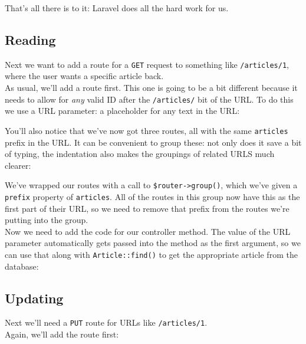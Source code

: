 
That's all there is to it: Laravel does all the hard work for us.


\subsection{Reading}

Next we want to add a route for a \texttt{GET} request to something like \texttt{/articles/1}, where the user wants a specific article back.
\\

As usual, we'll add a route first. This one is going to be a bit different because it needs to allow for \textit{any} valid ID after the \texttt{/articles/} bit of the URL. To do this we use a URL parameter: a placeholder for any text in the URL:


You'll also notice that we've now got three routes, all with the same \texttt{articles} prefix in the URL. It can be convenient to group these: not only does it save a bit of typing, the indentation also makes the groupings of related URLS much clearer:


We've wrapped our routes with a call to \texttt{\$router->group()}, which we've given a \texttt{prefix} property of \texttt{articles}. All of the routes in this group now have this as the first part of their URL, so we need to remove that prefix from the routes we're putting into the group.
\\

Now we need to add the code for our controller method. The value of the URL parameter automatically gets passed into the method as the first argument, so we can use that along with \texttt{Article::find()} to get the appropriate article from the database:



\subsection{Updating}

Next we'll need a \texttt{PUT} route for URLs like \texttt{/articles/1}.
\\

Again, we'll add the route first:

